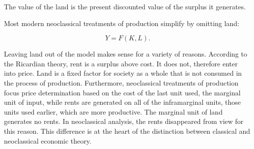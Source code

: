 The value of the land is the present discounted value of the surplus it generates.

Most modern neoclassical treatments of production simplify by omitting land: 

\begin{equation} 
Y=F(K,L).
\label{Eqn:Prod1}
\end{equation} 

Leaving land out of the model makes sense for a variety of reasons. According to the Ricardian theory, rent is a surplus above cost. It does not, therefore enter into price. Land is a fixed factor for society as a whole that is not consumed in  the process of production.  Furthermore, neoclassical treatments of production focus price determination based on the cost of the last unit used, the marginal  unit of input, while rents are generated on all of the inframarginal units, those units used earlier, which are more productive. The marginal unit of land generates no rents. In neoclassical analysis, the rents disappeared from view for this reason. This difference is at the heart of the distinction between classical and neoclassical economic theory. 


